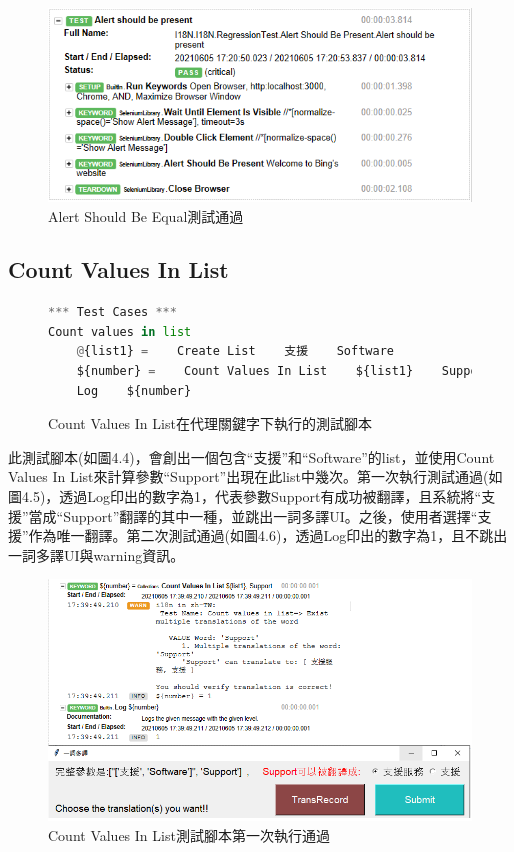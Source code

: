 \begin{figure}[H]
\includegraphics[width= \textwidth]{../論文截圖/4.1.1-3 pass.png}
\caption{Alert Should Be Equal測試通過}
\end{figure}

\subsection{Count Values In List}
\begin{figure}[H]
\begin{lstlisting}[language={python}]
*** Test Cases ***
Count values in list
    @{list1} =    Create List    支援    Software
    ${number} =    Count Values In List    ${list1}    Support
    Log    ${number}
\end{lstlisting}
\caption{Count Values In List在代理關鍵字下執行的測試腳本}
\end{figure}
此測試腳本(如圖4.4)，會創出一個包含“支援”和“Software”的list，並使用Count Values In List來計算參數“Support”出現在此list中幾次。第一次執行測試通過(如圖4.5)，透過Log印出的數字為1，代表參數Support有成功被翻譯，且系統將“支援”當成“Support”翻譯的其中一種，並跳出一詞多譯UI。之後，使用者選擇“支援”作為唯一翻譯。第二次測試通過(如圖4.6)，透過Log印出的數字為1，且不跳出一詞多譯UI與warning資訊。

\begin{figure}[H]
\includegraphics[width= \textwidth]{../論文截圖/4.1.2-2 count values in list 1st run.png}
\caption{Count Values In List測試腳本第一次執行通過}
\end{figure}

